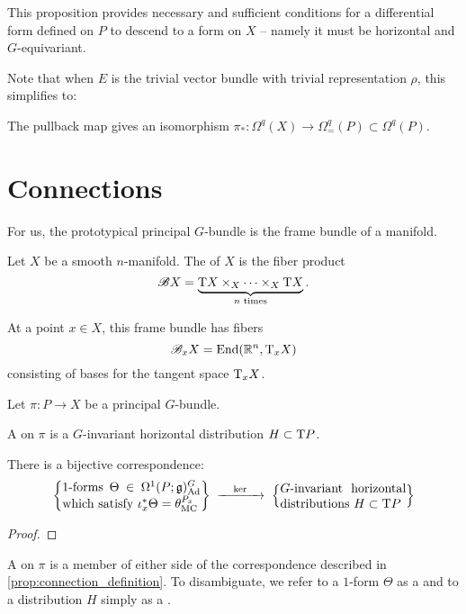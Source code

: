 This proposition provides necessary and sufficient conditions for a differential form defined on $P$ to descend to a form on $X$ -- namely it must be horizontal and $G$-equivariant.

Note that when $E$ is the trivial vector bundle with trivial representation $\rho$, this simplifies to:
\begin{corollary}
  The pullback map gives an isomorphism $\pi_* : \Omega^q(X) \to \Omega^q_=(P)\subset \Omega^q(P)$.
\end{corollary}

\section{Connections}


For us, the prototypical principal $G$-bundle is the frame bundle of a manifold.
\begin{definition}
  Let $X$ be a smooth $n$-manifold. The  of $X$ is the fiber product
  \[
    \mathscr{B} X = \underbrace{\operatorname{T}\! X\times_X \cdots \times_X \operatorname{T}\! X}_{n\textrm{ times}}. 
  \]
\end{definition}
At a point $x\in X$, this frame bundle has fibers
\[
    \mathscr{B}_x X = \operatorname{End}(\mathbb{R}^n, \operatorname{T}\!_x X)
\]
consisting of bases for the tangent space $\operatorname{T}\!_x X$.

Let $\pi : P \to X$ be a principal $G$-bundle.

\begin{definition}
  A  on $\pi$ is a $G$-invariant horizontal distribution $H\subset \operatorname{T}\! P$.
\end{definition}

\begin{proposition}\label{prop:connection_definition}
  There is a bijective correspondence:
  \[
    \left\{\parbox{11em} {
        1-forms $\Theta\in \Omega^1(P; \mathfrak{g})^G_\Ad$ which  
        satisfy $\iota_x^*\Theta = \theta_\MC^{P_x}$
    }\right\}
    \lkxto[\ker]
    \left\{\parbox{10em}{
        $G$-invariant horizontal distributions $H\subset \T P$
      }
    \right\}
  \]
\end{proposition}


\begin{proof}
\end{proof}

\begin{definition}
  A  on $\pi$ is a member of either side of the correspondence described in \cref{prop:connection_definition}. To disambiguate, we refer to a $1$-form $\Theta$ as a  and to a distribution $H$ simply as a .
\end{definition}

